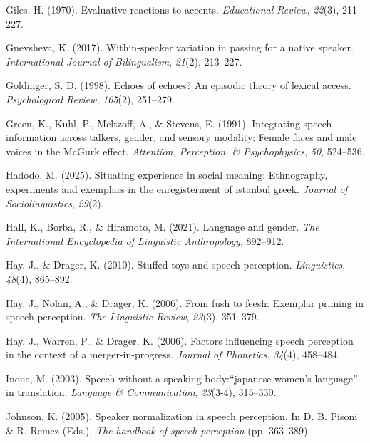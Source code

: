\documentclass[
  letterpaper,
  DIV=11,
  numbers=noendperiod]{scrartcl}
\newlength{\cslhangindent}
\newenvironment{CSLReferences}[2] %
 {\begin{list}{}{%
  \setlength{\itemindent}{0pt}
  \setlength{\leftmargin}{0pt}
  \setlength{\parsep}{0pt}
  \ifodd #1
   \setlength{\leftmargin}{\cslhangindent}
   \setlength{\itemindent}{-1\cslhangindent}
  \fi
  \setlength{\itemsep}{#2\baselineskip}}}
 {\end{list}}
\begin{document}
\begin{CSLReferences}{1}{0}
Giles, H. (1970). Evaluative reactions to accents. \emph{Educational
Review}, \emph{22}(3), 211--227.

Gnevsheva, K. (2017). Within-speaker variation in passing for a native
speaker. \emph{International Journal of Bilingualism}, \emph{21}(2),
213--227.

Goldinger, S. D. (1998). Echoes of echoes? An episodic theory of lexical
access. \emph{Psychological Review}, \emph{105}(2), 251--279.

Green, K., Kuhl, P., Meltzoff, A., \& Stevens, E. (1991). Integrating
speech information across talkers, gender, and sensory modality: Female
faces and male voices in the McGurk effect. \emph{Attention, Perception,
\& Psychophysics}, \emph{50}, 524--536.

Hadodo, M. (2025). Situating experience in social meaning: Ethnography,
experiments and exemplars in the enregisterment of istanbul greek.
\emph{Journal of Sociolinguistics}, \emph{29}(2).

Hall, K., Borba, R., \& Hiramoto, M. (2021). Language and gender.
\emph{The International Encyclopedia of Linguistic Anthropology},
892--912.

Hay, J., \& Drager, K. (2010). Stuffed toys and speech perception.
\emph{Linguistics}, \emph{48}(4), 865--892.

Hay, J., Nolan, A., \& Drager, K. (2006). From fush to feesh: Exemplar
priming in speech perception. \emph{The Linguistic Review},
\emph{23}(3), 351--379.

Hay, J., Warren, P., \& Drager, K. (2006). Factors influencing speech
perception in the context of a merger-in-progress. \emph{Journal of
Phonetics}, \emph{34}(4), 458--484.

Inoue, M. (2003). Speech without a speaking body:{``japanese women's
language''} in translation. \emph{Language \& Communication},
\emph{23}(3-4), 315--330.

Johnson, K. (2005). Speaker normalization in speech perception. In D. B.
Pisoni \& R. Remez (Eds.), \emph{The handbook of speech perception} (pp.
363--389).


\end{CSLReferences}
\end{document}
